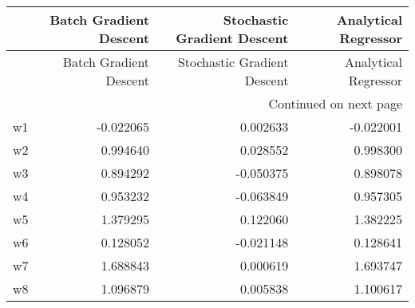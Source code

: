 \begin{longtable}{lrrr}
\toprule
 & Batch Gradient Descent & Stochastic Gradient Descent & Analytical Regressor \\
\midrule
\endfirsthead
\toprule
 & Batch Gradient Descent & Stochastic Gradient Descent & Analytical Regressor \\
\midrule
\endhead
\midrule
\multicolumn{4}{r}{Continued on next page} \\
\midrule
\endfoot
\bottomrule
\endlastfoot
w1 & -0.022065 & 0.002633 & -0.022001 \\
w2 & 0.994640 & 0.028552 & 0.998300 \\
w3 & 0.894292 & -0.050375 & 0.898078 \\
w4 & 0.953232 & -0.063849 & 0.957305 \\
w5 & 1.379295 & 0.122060 & 1.382225 \\
w6 & 0.128052 & -0.021148 & 0.128641 \\
w7 & 1.688843 & 0.000619 & 1.693747 \\
w8 & 1.096879 & 0.005838 & 1.100617 \\
\end{longtable}
